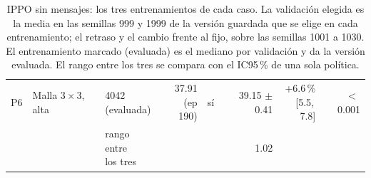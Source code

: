 \begin{table}[H]
\begin{tabular}{lllrlrrr}
P6 & \makecell[l]{Malla $3 \times 3$,\\{}alta} & \makecell[l]{4042\\{}(evaluada)} & \makecell[r]{37.91\\{}(ep 190)} & sí & \makecell[r]{39.15\\{}$\pm$ 0.41} & \makecell[r]{+6.6\,\%\\{}[5.5,\,7.8]} & $<$\,0.001 \\
 & & \makecell[l]{rango entre\\{}los tres} & & & 1.02 & & \\
\bottomrule
\end{tabular}
\caption[Entrenamientos de IPPO sin mensajes]{IPPO sin mensajes: los tres entrenamientos de cada caso. La validación elegida es la media en las semillas 999 y 1999 de la versión guardada que se elige en cada entrenamiento; el retraso y el cambio frente al fijo, sobre las semillas 1001 a 1030. El entrenamiento marcado (evaluada) es el mediano por validación y da la versión evaluada. El rango entre los tres se compara con el IC95\,\% de una sola política.}
\label{tab:veredicto-bases-ippo-local}
\end{table}

